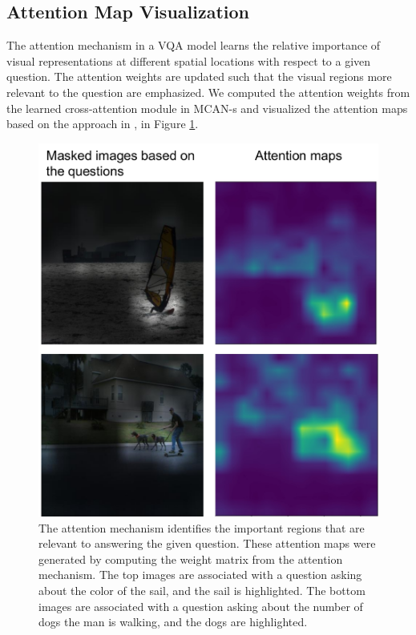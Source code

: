\documentclass[letterpaper]{article} %
\begin{document}
\subsection{Attention Map Visualization}
The attention mechanism in a VQA model learns the relative importance of visual representations at different spatial locations with respect to a given question. The attention weights are updated such that the visual regions more relevant to the question are emphasized. We computed the attention weights from the learned cross-attention module in MCAN-s and visualized the attention maps based on the approach in \cite{san}, in Figure \ref{fig:attention}.

\begin{figure}[!t]
    \centering
    \includegraphics[width=0.6\linewidth]{figures/attention.pdf}
    \caption{The attention mechanism identifies the important regions that are relevant to answering the given question. These attention maps were generated by computing the weight matrix from the attention mechanism. The top images are associated with a question asking about the color of the sail, and the sail is highlighted. The bottom images are associated with a question asking about the number of dogs the man is walking, and the dogs are highlighted.}    
    \label{fig:attention}
\end{figure}
\end{document}
